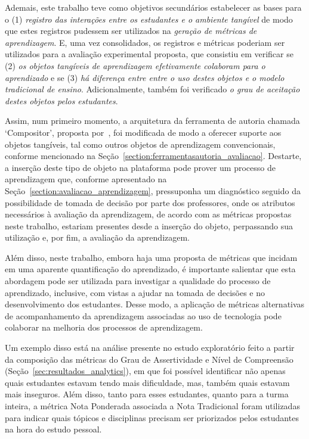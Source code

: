 Ademais, este trabalho teve como objetivos secundários estabelecer as bases para o (1) \textit{registro das interações entre os estudantes e o ambiente tangível} de modo que estes registros pudessem ser utilizados na \textit{geração de métricas de aprendizagem}. E, uma vez consolidados, os registros e métricas poderiam ser utilizados para a avaliação experimental proposta, que consistiu em verificar se (2) \textit{os objetos tangíveis de aprendizagem efetivamente colaboram para o aprendizado} e se (3) \textit{há diferença entre entre o uso destes objetos e o modelo tradicional de ensino}. Adicionalmente, também foi verificado \textit{o grau de aceitação destes objetos pelos estudantes}.

Assim, num primeiro momento, a arquitetura da ferramenta de autoria chamada `Compositor', proposta por~\cite{leitao:2017}, foi modificada de modo a oferecer suporte aos objetos tangíveis, tal como outros objetos de aprendizagem convencionais, conforme mencionado na Seção~\ref{section:ferramentasautoria_avaliacao}. Destarte, a inserção deste tipo de objeto na plataforma pode prover um processo de aprendizagem que, conforme apresentado na Seção~\ref{section:avaliacao_aprendizagem}, pressuponha um diagnóstico seguido da possibilidade de tomada de decisão por parte dos professores, onde os atributos necessários à avaliação da aprendizagem, de acordo com as métricas propostas neste trabalho, estariam presentes desde a inserção do objeto, perpassando sua utilização e, por fim, a avaliação da aprendizagem.

Além disso, neste trabalho, embora haja uma proposta de métricas que incidam em uma aparente quantificação do aprendizado, é importante salientar que esta abordagem pode ser utilizada para investigar a qualidade do processo de aprendizado, inclusive, com vistas a ajudar na tomada de decisões e no desenvolvimento dos estudantes. Desse modo, a aplicação de métricas alternativas de acompanhamento da aprendizagem associadas ao uso de tecnologia pode colaborar na melhoria dos processos de aprendizagem. 

Um exemplo disso está na análise presente no estudo exploratório feito a partir da composição das métricas do Grau de Assertividade e Nível de Compreensão (Seção~\ref{sec:resultados_analytics}), em que foi possível identificar não apenas quais estudantes estavam tendo mais dificuldade, mas, também quais estavam mais inseguros. Além disso, tanto para esses estudantes, quanto para a turma inteira, a métrica Nota Ponderada associada a Nota Tradicional foram utilizadas para indicar quais tópicos e disciplinas precisam ser priorizados pelos estudantes na hora do estudo pessoal.

